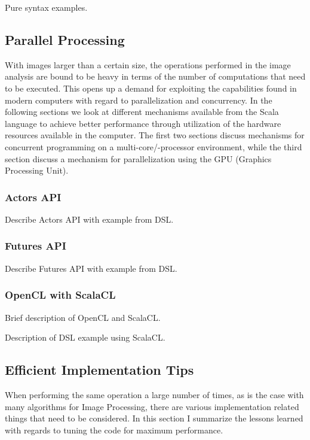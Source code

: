 \documentclass[a4paper,english]{report}
\begin{document}
Pure syntax examples.

\subsection{Parallel Processing}

With images larger than a certain size, the operations performed in
the image analysis are bound to be heavy in terms of the number of
computations that need to be executed. This opens up a demand for
exploiting the capabilities found in modern computers with regard to
parallelization and concurrency. In the following sections we look at
different mechanisms available from the Scala language to achieve
better performance through utilization of the hardware resources
available in the computer. The first two sections discuss mechanisms
for concurrent programming on a multi-core/-processor environment,
while the third section discuss a mechanism for parallelization using
the GPU (Graphics Processing Unit).

\subsubsection{Actors API}
\label{sec:actors}

Describe Actors API with example from DSL.

\subsubsection{Futures API}
\label{sec:futures}

Describe Futures API with example from DSL.

\subsubsection{OpenCL with ScalaCL}
\label{sec:opencl}

Brief description of OpenCL\cite{opencl} and ScalaCL\cite{scalacl}.

Description of DSL example using ScalaCL.

\subsection{Efficient Implementation Tips}
\label{sec:effimpl}

When performing the same operation a large number of times, as is the
case with many algorithms for Image Processing, there are various
implementation related things that need to be considered. In this
section I summarize the lessons learned with regards to tuning the
code for maximum performance.
\end{document}
